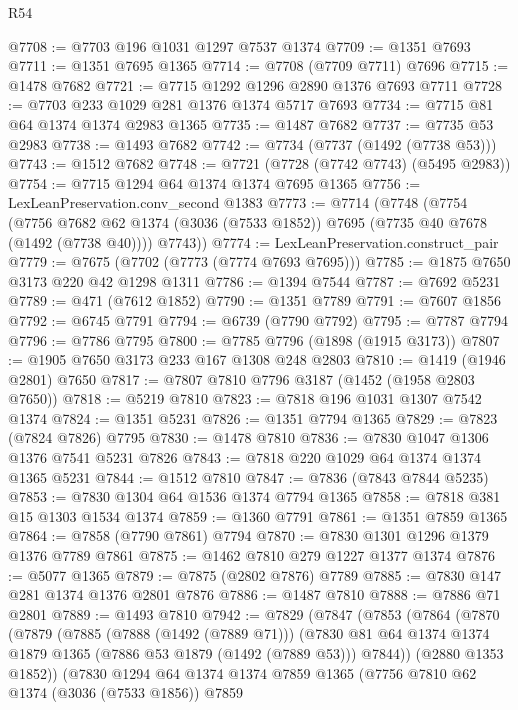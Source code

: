 \begin{lexlean}{R54}
\begin{coremodule}
@7708 := @7703 @196 @1031 @1297 @7537 @1374
@7709 := @1351 @7693
@7711 := @1351 @7695 @1365
@7714 := @7708 (@7709 @7711) @7696
@7715 := @1478 @7682
@7721 := @7715 @1292 @1296 @2890 @1376 @7693 @7711
@7728 := @7703 @233 @1029 @281 @1376 @1374 @5717 @7693
@7734 := @7715 @81 @64 @1374 @1374 @2983 @1365
@7735 := @1487 @7682
@7737 := @7735 @53 @2983
@7738 := @1493 @7682
@7742 := @7734 (@7737 (@1492 (@7738 @53)))
@7743 := @1512 @7682
@7748 := @7721 (@7728 (@7742 @7743) (@5495 @2983))
@7754 := @7715 @1294 @64 @1374 @1374 @7695 @1365
@7756 := LexLeanPreservation.conv_second @1383
@7773 := @7714
    (@7748
      (@7754
        (@7756 @7682 @62 @1374 (@3036 (@7533 @1852)) @7695 (@7735 @40 @7678 (@1492 (@7738 @40))))
        @7743))
@7774 := LexLeanPreservation.construct_pair
@7779 := @7675 (@7702 (@7773 (@7774 @7693 @7695)))
@7785 := @1875 @7650 @3173 @220 @42 @1298 @1311
@7786 := @1394 @7544
@7787 := @7692 @5231
@7789 := @471 (@7612 @1852)
@7790 := @1351 @7789
@7791 := @7607 @1856
@7792 := @6745 @7791
@7794 := @6739 (@7790 @7792)
@7795 := @7787 @7794
@7796 := @7786 @7795
@7800 := @7785 @7796 (@1898 (@1915 @3173))
@7807 := @1905 @7650 @3173 @233 @167 @1308 @248 @2803
@7810 := @1419 (@1946 @2801) @7650
@7817 := @7807 @7810 @7796 @3187 (@1452 (@1958 @2803 @7650))
@7818 := @5219 @7810
@7823 := @7818 @196 @1031 @1307 @7542 @1374
@7824 := @1351 @5231
@7826 := @1351 @7794 @1365
@7829 := @7823 (@7824 @7826) @7795
@7830 := @1478 @7810
@7836 := @7830 @1047 @1306 @1376 @7541 @5231 @7826
@7843 := @7818 @220 @1029 @64 @1374 @1374 @1365 @5231
@7844 := @1512 @7810
@7847 := @7836 (@7843 @7844 @5235)
@7853 := @7830 @1304 @64 @1536 @1374 @7794 @1365
@7858 := @7818 @381 @15 @1303 @1534 @1374
@7859 := @1360 @7791
@7861 := @1351 @7859 @1365
@7864 := @7858 (@7790 @7861) @7794
@7870 := @7830 @1301 @1296 @1379 @1376 @7789 @7861
@7875 := @1462 @7810 @279 @1227 @1377 @1374
@7876 := @5077 @1365
@7879 := @7875 (@2802 @7876) @7789
@7885 := @7830 @147 @281 @1374 @1376 @2801 @7876
@7886 := @1487 @7810
@7888 := @7886 @71 @2801
@7889 := @1493 @7810
@7942 := @7829
    (@7847
      (@7853
        (@7864
          (@7870
            (@7879
              (@7885
                (@7888 (@1492 (@7889 @71)))
                (@7830 @81 @64 @1374 @1374 @1879 @1365 (@7886 @53 @1879 (@1492 (@7889 @53))) @7844))
              (@2880 @1353 @1852))
            (@7830
              @1294
              @64
              @1374
              @1374
              @7859
              @1365
              (@7756
                @7810
                @62
                @1374
                (@3036 (@7533 @1856))
                @7859

\end{coremodule}
\end{lexlean}
